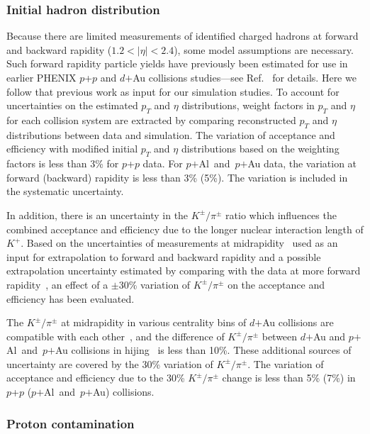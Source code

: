 \documentclass[twocolumn,letterpaper,aps,prc,longbibliography,superscriptaddress,nofootinbib,floatfix]{revtex4-2}
\newcommand{\pt}{\mbox{$p_T$}\xspace}
\newcommand{\pp}{\mbox{$p$+$p$}\xspace}
\newcommand{\dau}{\mbox{$d$$+$Au}\xspace}
\newcommand{\palau}{\mbox{$p$$+$Al and $p$$+$Au}\xspace}
\newcommand{\hijing}{\mbox{{\sc hijing}}\xspace}
\begin{document}
\subsubsection{Initial hadron distribution}

Because there are limited measurements of identified charged hadrons at 
forward and backward rapidity ($1.2<|\eta|<2.4$), some model assumptions 
are necessary.  Such forward rapidity particle yields have previously 
been estimated for use in earlier PHENIX \pp and \dau collisions 
studies---see Ref.~\cite{Adare:2013lkk} for details.  Here we follow 
that previous work as input for our simulation studies. To 
account for uncertainties on the estimated \pt and $\eta$ distributions, 
weight factors in \pt and $\eta$ for each collision system are 
extracted by comparing reconstructed \pt and $\eta$ distributions 
between data and simulation. The variation of acceptance and efficiency 
with modified initial \pt and $\eta$ distributions based on the 
weighting factors is less than 3\% for \pp data. For \palau data, the 
variation at forward (backward) rapidity is less than 3\% (5\%). The 
variation is included in the systematic uncertainty.

In addition, there is an uncertainty in the $K^{\pm}/\pi^{\pm}$ ratio 
which influences the combined acceptance and efficiency due to the 
longer nuclear interaction length of $K^{+}$. Based on the uncertainties 
of measurements at 
midrapidity~\cite{Adare:2011vy,Agakishiev:2011dc,Adare:2013esx} used as 
an input for extrapolation to forward and backward rapidity and a 
possible extrapolation uncertainty estimated by comparing with the data 
at more forward rapidity~\cite{Arsene:2007jd}, an effect of a $\pm$30\% 
variation of $K^{\pm}/\pi^{\pm}$ on the acceptance and efficiency has 
been evaluated.

The $K^{\pm}/\pi^{\pm}$ at midrapidity in various centrality bins of 
\dau collisions are compatible with each other~\cite{Adare:2013esx}, and 
the difference of $K^{\pm}/\pi^{\pm}$ between \dau and \palau collisions 
in \hijing~\cite{Gyulassy:1994ew} is less than 10\%. These additional 
sources of uncertainty are covered by the 30\% variation of 
$K^{\pm}/\pi^{\pm}$. The variation of acceptance and efficiency due to 
the 30\% $K^{\pm}/\pi^{\pm}$ change is less than 5\% (7\%) in \pp 
(\palau) collisions.

\subsubsection{Proton contamination}
\end{document}
